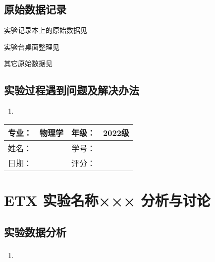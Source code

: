 \documentclass[dvipsnames, svgnames,a4paper,11pt]{article}
\begin{document}
	\subsubsection{}
	\begin{enumerate}
		
	\end{enumerate}
	
	
	\clearpage
	\subsection{原始数据记录}
	实验记录本上的原始数据见%
	
	实验台桌面整理见%
	
	其它原始数据见%
	
	\subsection{实验过程遇到问题及解决办法}
	\begin{enumerate}
		\item 
	\end{enumerate}
	
	
	
	\clearpage
	
	\begin{table}
		\renewcommand\arraystretch{1.7}
		\begin{tabularx}{\textwidth}{|X|X|X|X|}
			\hline
			专业：& 物理学 &年级：& 2022级\\
			\hline
			姓名： &  & 学号：& \\
			\hline
			日期：&  & 评分： &\\
			\hline
		\end{tabularx}
	\end{table}
	
	\section{ETX 实验名称××× \quad\heiti 分析与讨论}
	
	\subsection{实验数据分析}
	
	\subsubsection{}
	\begin{enumerate}
		\item 
	\end{enumerate}
	
\end{document}
